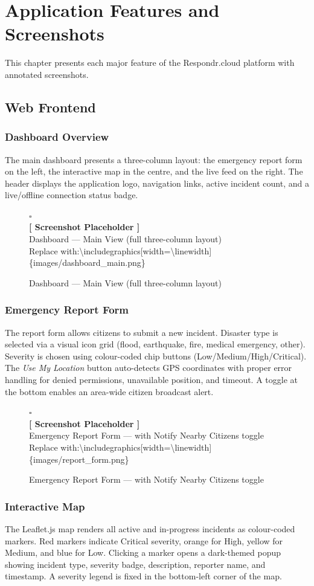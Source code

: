 \documentclass[12pt, a4paper]{report}
\newcommand{\screenshot}[4]{%
  \begin{figure}[H]
    \centering
    \begin{tcolorbox}[
      enhanced,
      width      = #1\linewidth,
      height     = #2cm,
      colback    = placeholderbg,
      colframe   = placeholderborder,
      arc        = 4pt,
      boxrule    = 0.8pt,
      halign     = center,
      valign     = center,
    ]
      {\color{placeholdertext}\Large$\square$}\\[8pt]
      {\color{placeholdertext}\small\bfseries [ Screenshot Placeholder ]}\\[6pt]
      {\color{placeholdertext}\small #3}\\[4pt]
      {\color{placeholderborder}\footnotesize\ttfamily
        Replace with:\enspace\textbackslash includegraphics[width=\textbackslash linewidth]\{images/#4.png\}}
    \end{tcolorbox}
    \caption{#3}
    \label{fig:#4}
  \end{figure}%
}
\begin{document}
\chapter{Application Features and Screenshots}

This chapter presents each major feature of the Respondr.cloud platform with annotated screenshots.

\section{Web Frontend}

\subsection{Dashboard Overview}

The main dashboard presents a three-column layout: the emergency report form on the left, the interactive map in the centre, and the live feed on the right. The header displays the application logo, navigation links, active incident count, and a live/offline connection status badge.

\screenshot{0.95}{7}{Dashboard --- Main View (full three-column layout)}{dashboard_main}

\subsection{Emergency Report Form}

The report form allows citizens to submit a new incident. Disaster type is selected via a visual icon grid (flood, earthquake, fire, medical emergency, other). Severity is chosen using colour-coded chip buttons (Low/Medium/High/Critical). The \textit{Use My Location} button auto-detects GPS coordinates with proper error handling for denied permissions, unavailable position, and timeout. A toggle at the bottom enables an area-wide citizen broadcast alert.

\screenshot{0.55}{10}{Emergency Report Form --- with Notify Nearby Citizens toggle}{report_form}

\subsection{Interactive Map}

The Leaflet.js map renders all active and in-progress incidents as colour-coded markers. Red markers indicate Critical severity, orange for High, yellow for Medium, and blue for Low. Clicking a marker opens a dark-themed popup showing incident type, severity badge, description, reporter name, and timestamp. A severity legend is fixed in the bottom-left corner of the map.
\end{document}

